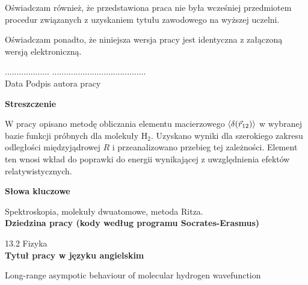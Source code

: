\documentclass[a4paper,12pt]{article}
\begin{document}
\noindent Oświadczam również, że przedstawiona praca nie była wcześniej przedmiotem procedur związanych z uzyskaniem tytułu zawodowego na wyższej uczelni.
\vspace{0.3cm}

\noindent Oświadczam ponadto, że niniejsza wersja pracy jest identyczna z załączoną wersją elektroniczną.
\vspace{1cm}

\noindent ................... \hfill ........................................\\
 Data \hfill Podpis autora pracy
\newpage
%
%
%
%
\newpage
\begin{center}
\textbf{Streszczenie}
\end{center}

W pracy opisano metodę obliczania elementu macierzowego $\braket{\delta({\vec{r}_{12}})}$  w wybranej bazie funkcji próbnych dla molekuły H$_2$. Uzyskano wyniki dla szerokiego zakresu odległości międzyjądrowej $R$ i przeanalizowano przebieg tej zależności. Element ten wnosi wkład do poprawki do energii wynikającej z uwzględnienia efektów relatywistycznych.
\vspace{2.5cm}
\begin{center}
\textbf{Słowa kluczowe}\vspace{0.3cm}

Spektroskopia, molekuły dwuatomowe, metoda Ritza.\\
\vspace{2.5cm}
\textbf{Dziedzina pracy (kody według programu Socrates-Erasmus)}\vspace{0.3cm}

13.2 Fizyka\\
\vspace{2.5cm}
\textbf{Tytuł pracy w języku angielskim}\vspace{0.3cm}

Long-range asympotic behaviour of molecular hydrogen wavefunction
\end{center}
\newpage

%
%
\end{document}
